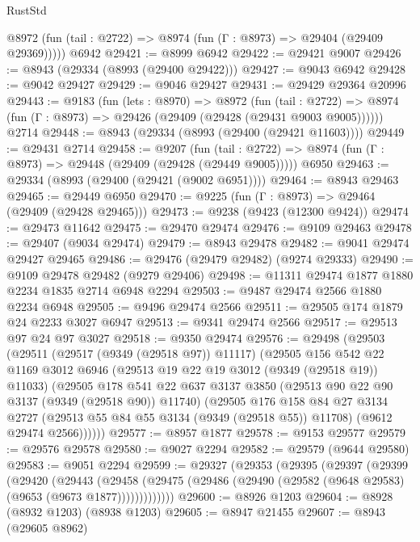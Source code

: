 \begin{lexlean}{RustStd}
\begin{coremodule}
{\begin{coremodule}
{{{{{{{{{{{{{{{{{{{{{{{{{{{{{{{{{{{{{{{      @8972 (fun (tail : @2722) => @8974 (fun (Γ : @8973) => @29404 (@29409 @29369)))))
    @6942
@29421 := @8999 @6942
@29422 := @29421 @9007
@29426 := @8943 (@29334 (@8993 (@29400 @29422)))
@29427 := @9043 @6942
@29428 := @9042 @29427
@29429 := @9046 @29427
@29431 := @29429 @29364 @20996
@29443 := @9183
    (fun (lets : @8970) =>
    @8972
      (fun (tail : @2722) =>
      @8974 (fun (Γ : @8973) => @29426 (@29409 (@29428 (@29431 @9003 @9005))))))
    @2714
@29448 := @8943 (@29334 (@8993 (@29400 (@29421 @11603))))
@29449 := @29431 @2714
@29458 := @9207
    (fun (tail : @2722) => @8974 (fun (Γ : @8973) => @29448 (@29409 (@29428 (@29449 @9005)))))
    @6950
@29463 := @29334 (@8993 (@29400 (@29421 (@9002 @6951))))
@29464 := @8943 @29463
@29465 := @29449 @6950
@29470 := @9225 (fun (Γ : @8973) => @29464 (@29409 (@29428 @29465)))
@29473 := @9238 (@9423 (@12300 @9424))
@29474 := @29473 @11642
@29475 := @29470 @29474
@29476 := @9109 @29463
@29478 := @29407 (@9034 @29474)
@29479 := @8943 @29478
@29482 := @9041 @29474 @29427 @29465
@29486 := @29476 (@29479 @29482) (@9274 @29333)
@29490 := @9109 @29478 @29482 (@9279 @29406)
@29498 := @11311 @29474 @1877 @1880 @2234 @1835 @2714 @6948 @2294
@29503 := @9487 @29474 @2566 @1880 @2234 @6948
@29505 := @9496 @29474 @2566
@29511 := @29505 @174 @1879 @24 @2233 @3027 @6947
@29513 := @9341 @29474 @2566
@29517 := @29513 @97 @24 @97 @3027
@29518 := @9350 @29474
@29576 := @29498
    (@29503
      (@29511
        (@29517 (@9349 (@29518 @97)) @11117)
        (@29505
          @156
          @542
          @22
          @1169
          @3012
          @6946
          (@29513 @19 @22 @19 @3012 (@9349 (@29518 @19)) @11033)
          (@29505
            @178
            @541
            @22
            @637
            @3137
            @3850
            (@29513 @90 @22 @90 @3137 (@9349 (@29518 @90)) @11740)
            (@29505
              @176
              @158
              @84
              @27
              @3134
              @2727
              (@29513 @55 @84 @55 @3134 (@9349 (@29518 @55)) @11708)
              (@9612 @29474 @2566))))))
@29577 := @8957 @1877
@29578 := @9153 @29577
@29579 := @29576 @29578
@29580 := @9027 @2294
@29582 := @29579 (@9644 @29580)
@29583 := @9051 @2294
@29599 := @29327
    (@29353
      (@29395
        (@29397
          (@29399
            (@29420
              (@29443
                (@29458
                  (@29475 (@29486 (@29490 (@29582 (@9648 @29583) (@9653 (@9673 @1877)))))))))))))
@29600 := @8926 @1203
@29604 := @8928 (@8932 @1203) (@8938 @1203)
@29605 := @8947 @21455
@29607 := @8943 (@29605 @8962)
}}}}}}}}}}}}}}}}}}}}}}}}}}}}}}}}}}}}}}}
\end{coremodule}}
\end{coremodule}
\end{lexlean}
